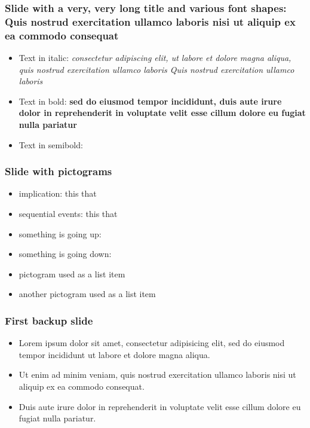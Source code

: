 \documentclass[11pt, xcolor={dvipsnames}, usepdftitle=false]{beamer}
\begin{document}
\begin{frame}
\frametitle{Slide with a very, very long title and various font shapes: Quis nostrud exercitation ullamco laboris nisi ut aliquip ex ea commodo consequat}
\begin{itemize}
\item Text in italic: \textit{consectetur adipiscing elit, ut labore et dolore magna aliqua, quis nostrud exercitation ullamco laboris Quis nostrud exercitation ullamco laboris}
\item Text in bold: \textbf{sed do eiusmod tempor incididunt, duis aute irure dolor in reprehenderit in voluptate velit esse cillum dolore eu fugiat nulla pariatur}
\item Text in semibold: 
\end{itemize}
\end{frame}

\begin{frame}
\frametitle{Slide with pictograms}
\begin{itemize}
\item implication: this \so that
\item sequential events: this \then that
\item something is going up: \up
\item something is going down: \down
\item[\so] pictogram used as a list item
\item[\then] another pictogram used as a list item
\end{itemize}
\end{frame}

\lastslide

\begin{frame}[label=backupSlide]
\frametitle{First backup slide}
\begin{itemize}
\item Lorem ipsum dolor sit amet, consectetur adipisicing elit, sed do eiusmod
tempor incididunt ut labore et dolore magna aliqua.
\item  Ut enim ad minim veniam, quis nostrud exercitation ullamco laboris nisi ut aliquip ex ea commodo consequat. 
\item Duis aute irure dolor in reprehenderit in voluptate velit esse
cillum dolore eu fugiat nulla pariatur. 
\end{itemize}
\hyperlink{firstSlide}{}
\end{frame}
\end{document}

